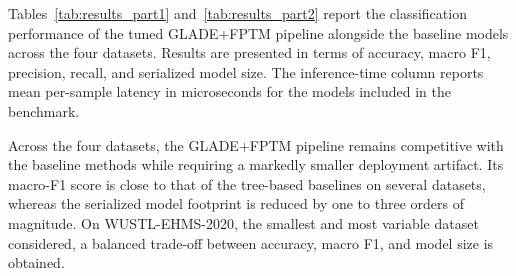 \documentclass[journal,twoside,web]{ieeecolor}
\begin{document}
Tables~\ref{tab:results_part1} and~\ref{tab:results_part2} report the
classification performance of the tuned GLADE+FPTM pipeline alongside
the baseline models across the four datasets. Results are presented in
terms of accuracy, macro F1, precision, recall, and serialized model
size. The inference-time column reports mean per-sample latency in
microseconds for the models included in the benchmark.

Across the four datasets, the GLADE+FPTM pipeline remains competitive
with the baseline methods while requiring a markedly smaller
deployment artifact. Its macro-F1 score is close to that of the
tree-based baselines on several datasets, whereas the serialized model
footprint is reduced by one to three orders of magnitude. On
WUSTL-EHMS-2020, the smallest and most variable dataset considered, a
balanced trade-off between accuracy, macro F1, and model size is
obtained.
\end{document}
